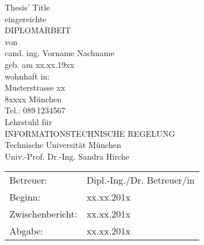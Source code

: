 \documentclass[a4paper,twoside, openright,12pt]{report}
\begin{document}
\pagestyle{empty}
\enlargethispage{4.5cm} %
\begin{center}
\phantom{u}
\vspace{0.5cm}
\Huge{\sc Thesis' Title}\\
\vspace{1.5cm}
                                 \large{eingereichte\\
			  DIPLOMARBEIT\\%
                                           von\\

						\vspace{0.4cm}
					cand. ing. Vorname Nachname\\
						\vspace{0.5cm}
					geb. am xx.xx.19xx\\
					wohnhaft in:\\
					Musterstrasse xx\\
					8xxxx M\"unchen\\
					Tel.: 089\,1234567\\
					\vspace{1.5cm}
					Lehrstuhl f\"ur\\
					INFORMATIONSTECHNISCHE REGELUNG \\
					Technische Universit\"at M\"unchen\\
					\vspace{0.6cm}
                    Univ.-Prof. Dr.-Ing. Sandra Hirche}
\end{center}
\vspace{5.0cm}
\begin{tabular}{ll}
Betreuer: & Dipl.-Ing./Dr. Betreuer/in  \\
Beginn: & xx.xx.201x  \\
Zwischenbericht: &  xx.xx.201x  \\
Abgabe: &  xx.xx.201x \\
\end{tabular}

\newpage
\cleardoublepage
\end{document}
